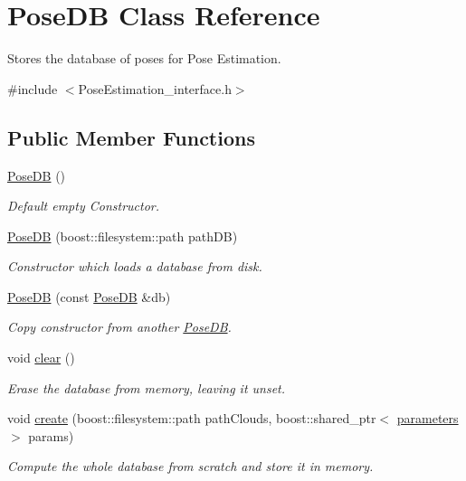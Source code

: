 \hypertarget{classPoseDB}{\section{Pose\-D\-B Class Reference}
\label{classPoseDB}
}


Stores the database of poses for Pose Estimation.  




{\ttfamily \#include $<$Pose\-Estimation\-\_\-interface.\-h$>$}

\subsection*{Public Member Functions}
\begin{DoxyCompactItemize}
\item 
\hyperlink{classPoseDB_a48e3cf9cde2b5f6a1a87e0d4f666e13f}{Pose\-D\-B} ()
\begin{DoxyCompactList}\small\item\em Default empty Constructor. \end{DoxyCompactList}\item 
\hyperlink{classPoseDB_ac7c624b7de4a42c229a9a96e1b90b0d2}{Pose\-D\-B} (boost\-::filesystem\-::path path\-D\-B)
\begin{DoxyCompactList}\small\item\em Constructor which loads a database from disk. \end{DoxyCompactList}\item 
\hyperlink{classPoseDB_af9c57a382e2693f875502d7dbd311c71}{Pose\-D\-B} (const \hyperlink{classPoseDB}{Pose\-D\-B} \&db)
\begin{DoxyCompactList}\small\item\em Copy constructor from another \hyperlink{classPoseDB}{Pose\-D\-B}. \end{DoxyCompactList}\item 
void \hyperlink{classPoseDB_a608ac44000f275c1085c208e7906b95d}{clear} ()
\begin{DoxyCompactList}\small\item\em Erase the database from memory, leaving it unset. \end{DoxyCompactList}\item 
void \hyperlink{classPoseDB_a32f79ac5a9a8be7763027a5b69b52ad1}{create} (boost\-::filesystem\-::path path\-Clouds, boost\-::shared\-\_\-ptr$<$ \hyperlink{group__Definitions_gacbb28d8f791bb363852e522cf3b83c47}{parameters} $>$ params)
\begin{DoxyCompactList}\small\item\em Compute the whole database from scratch and store it in memory. \end{DoxyCompactList}\item 

\end{DoxyCompactItemize}
